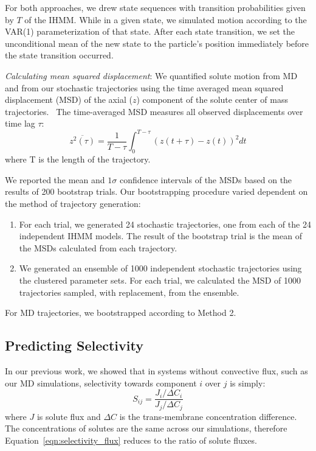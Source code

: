 \documentclass[journal=jpcbfk,manuscript=article]{achemso}
\begin{document}
  For both approaches, we drew state sequences with transition probabilities given 
  by $T$ of the IHMM. While in a given state, we simulated motion according to the 
  VAR(1) parameterization of that state. After each state transition, we set the 
  unconditional mean of the new state to the particle's position immediately before
  the state transition occurred.
  
  \textit{Calculating mean squared displacement}: We quantified solute motion from
  MD and from our stochastic trajectories using the time averaged mean squared 
  displacement (MSD) of the axial ($z$) component of the solute center of mass
  trajectories.~\cite{meroz_toolbox_2015} The time-averaged MSD measures all observed 
  displacements over time lag $\tau$:
  \begin{equation}
  	\overline{z^2(\tau)} = \dfrac{1}{T - \tau}\int_{0}^{T - \tau} (z(t + \tau) - z(t))^2 dt
  \label{eqn:tamsd}
  \end{equation}
  where T is the length of the trajectory. 
  
  We reported the mean and $1 \sigma$ confidence intervals of the MSDs based on the 
  results of 200 bootstrap trials. Our bootstrapping procedure varied dependent on the
  method of trajectory generation:
  \begin{enumerate}[label={Method \theenumi :}, leftmargin=3.5\parindent]
  	\item For each trial, we generated 24 stochastic trajectories, one from each of
  	the 24 independent IHMM models. The result of the bootstrap trial is the mean
  	of the MSDs calculated from each trajectory. 
    \item We generated an ensemble of 1000 independent stochastic trajectories using
    the clustered parameter sets. For each trial, we calculated the MSD of 1000 
    trajectories sampled, with replacement, from the ensemble.
  \end{enumerate}
  
  For MD trajectories, we bootstrapped according to Method 2.
  
  \subsection{Predicting Selectivity}\label{method:selectivity}
  
  In our previous work, we showed that in systems without convective flux, such
  as our MD simulations, selectivity towards component $i$ over $j$ is simply:
  \begin{equation}
  S_{ij} = \frac{J_i / \Delta C_i}{J_j / \Delta C_j}
  \label{eqn:selectivity_flux}
  \end{equation}
  where $J$ is solute flux and $\Delta C$ is the trans-membrane concentration
  difference.~\cite{coscia_capturing_2020} The concentrations of solutes are the
  same across our simulations, therefore Equation~\ref{eqn:selectivity_flux} 
  reduces to the ratio of solute fluxes. 
  
\end{document}
